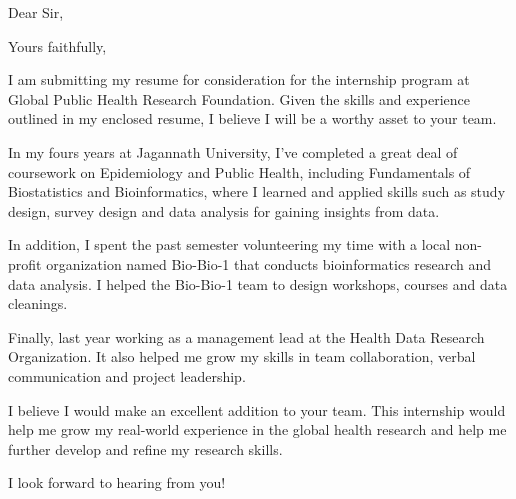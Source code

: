 \documentclass[12pt,a4paper]{moderncv}
\date{January 01, 1984}
\begin{document}
	\opening{Dear Sir,}
	\closing{Yours faithfully,}
		        
	\makelettertitle
	\justify 
	
	I am submitting my resume for consideration for the internship program at 
	Global Public Health Research Foundation. Given the skills and experience 
	outlined in my enclosed resume, I believe I will be a worthy asset to your 
	team.
	
	In my fours years at Jagannath University, I’ve completed a great deal of 
	coursework on Epidemiology and Public Health, including Fundamentals of 
	Biostatistics and Bioinformatics, where I learned and applied skills such 
	as study design, survey design and data analysis for gaining insights from 
	data.
	
	In addition, I spent the past semester volunteering my time with a local 
	non-profit organization named Bio-Bio-1 that conducts bioinformatics 
	research and data analysis. I helped the Bio-Bio-1 team to design 
	workshops, courses and data cleanings.
	
	Finally, last year working as a management lead at the Health Data Research 
	Organization. It also helped me grow my skills in team collaboration, 
	verbal communication and project leadership.
	
	I believe I would make an excellent addition to your team. This internship 
	would help me grow my real-world experience in the global health research 
	and help me further develop and refine my research skills.
	
	I look forward to hearing from you!
	
	\makeletterclosing	
\vspace{-15cm}
	
\end{document}
